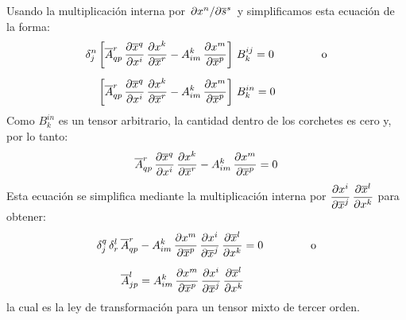 \documentclass[hidelinks,12pt]{article}
\begin{document}
Usando la multiplicación interna por $\pdv*{x^{n}}{\overline{s}^{s}}$ y simplificamos esta ecuación de la forma:
\begin{align*}
\delta_{j}^{n} &\left[ \overline{A}_{qp}^{r} \, \pdv{\overline{x}^{q}}{x^{i}} \, \pdv{x^{k}}{\overline{x}^{r}} - A_{im}^{k} \, \pdv{x^{m}}{\overline{x}^{p}} \right] \, B_{k}^{ij} = 0 \hspace{1.5cm} \text{o} \\[0.5em]
&\left[ \overline{A}_{qp}^{r} \, \pdv{\overline{x}^{q}}{x^{i}} \, \pdv{x^{k}}{\overline{x}^{r}} - A_{im}^{k} \, \pdv{x^{m}}{\overline{x}^{p}} \right] \, B_{k}^{in} = 0
\end{align*}
Como $B_{k}^{in}$ es un tensor arbitrario, la cantidad dentro de los corchetes es cero y, por lo tanto:
\begin{align*}
\overline{A}_{qp}^{r} \, \pdv{\overline{x}^{q}}{x^{i}} \, \pdv{x^{k}}{\overline{x}^{r}} - A_{im}^{k} \, \pdv{x^{m}}{\overline{x}^{p}} = 0
\end{align*}
Esta ecuación se simplifica mediante la multiplicación interna por $\displaystyle \pdv{x^{i}}{\overline{x}^{j}} \, \pdv{\overline{x}^{l}}{x^{k}}$ para obtener:
\begin{align*}
\delta_{j}^{q} \, \delta_{r}^{l} \, \overline{A}_{qp}^{r} &- A_{im}^{k} \, \pdv{x^{m}}{\overline{x}^{p}} \, \pdv{x^{i}}{\overline{x}^{j}} \, \pdv{\overline{x}^{l}}{x^{k}} = 0 \hspace{1.5cm} \text{o} \\[0.5em]
\overline{A}_{jp}^{l} &= A_{im}^{k} \, \pdv{x^{m}}{\overline{x}^{p}} \, \pdv{x^{i}}{\overline{x}^{j}} \, \pdv{\overline{x}^{l}}{x^{k}}
\end{align*}
la cual es la ley de transformación para un tensor mixto de tercer orden.
\end{document}
